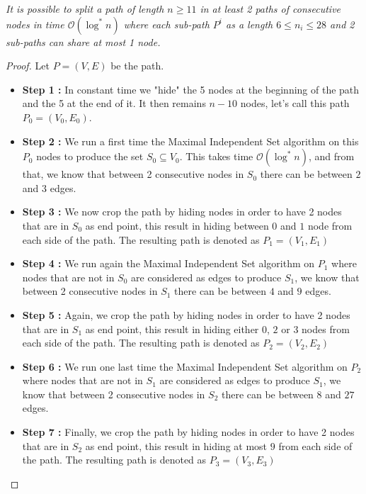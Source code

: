 \begin{claim}\label{claim:path} 
\textit{It is possible to split a path of length $n\geq 11$ in at least 2 paths of consecutive nodes in time $\mathcal{O}(\log^*n)$ where each sub-path $P^i$ as a length $6\leq n_i \leq 28$ and 2 sub-paths can share at most 1 node. }
\begin{proof}
Let $P=(V,E)$ be the path.
\begin{itemize}
\item\textbf{Step 1 :} In constant time we "hide" the 5 nodes at the beginning of the path and the 5 at the end of it.
It then remains $n-10$ nodes, let's call this path $P_0=(V_0,E_0)$.\\
\item\textbf{Step 2 :} We run a first time the Maximal Independent Set algorithm on this $P_0$ nodes to produce the set $S_0\subseteq V_0$. This takes time $\mathcal{O}(\log^*n)$, and from that, we know that between 2 consecutive nodes in $S_0$ there can be between $2$ and $3$ edges.\\
\item\textbf{Step 3 :} We now crop the path by hiding nodes in order to have 2 nodes that are in $S_0$ as end point, this result in hiding between $0$ and $1$ node from each side of the path. The resulting path is denoted as $P_1=(V_1,E_1)$\\
\item\textbf{Step 4 :} We run again the Maximal Independent Set algorithm on $P_1$ where nodes that are not in $S_0$ are considered as edges to produce $S_1$, we know that between 2 consecutive nodes in $S_1$ there can be between $4$ and $9$ edges.\\
\item\textbf{Step 5 :} Again, we crop the path by hiding nodes in order to have 2 nodes that are in $S_1$ as end point, this result in hiding either $0$, $2$ or $3$ nodes from each side of the path. The resulting path is denoted as $P_2=(V_2,E_2)$\\
\item\textbf{Step 6 :} We run one last time the Maximal Independent Set algorithm on $P_2$ where nodes that are not in $S_1$ are considered as edges to produce $S_1$, we know that between 2 consecutive nodes in $S_2$ there can be between $8$ and $27$ edges.\\
\item\textbf{Step 7 :} Finally, we crop the path by hiding nodes in order to have 2 nodes that are in $S_2$ as end point, this result in hiding at most $9$ from each side of the path. The resulting path is denoted as $P_3=(V_3,E_3)$\\

\end{itemize}
\end{proof}
\end{claim}
